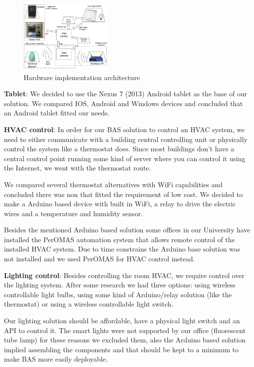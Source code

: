 \documentclass[conference]{IEEEtran}
\begin{document}
\begin{figure}[h]
\centering
\includegraphics[width=0.4\textwidth]{Figures/harware_arch_imp}
\caption{Hardware implementation architecture}
\label{imp:architecture_system}
\end{figure}

\textbf{Tablet}: We decided to use the Nexus 7 (2013) Android tablet as the base of our solution. We compared IOS, Android and Windows devices and concluded that an Android tablet fitted our needs.

\textbf{HVAC control}: In order for our \ac{BAS} solution to control an \ac{HVAC} system, we need to either communicate with a building central controlling unit or physically control the system like a thermostat does. Since most buildings don't have a central control point running some kind of server where you can control it using the Internet, we went with the thermostat route.

We compared several thermostat alternatives with WiFi capabilities and concluded there was non that fitted the requirement of low cost. We decided to make a Arduino based device with built in \ac{WiFi}, a relay to drive the electric wires and a temperature and humidity sensor. 

Besides the mentioned Arduino based solution some offices in our University have installed the PerOMAS automation system that allows remote control of the installed HVAC system. Due to time constrains the Arduino base solution was not installed and we used PerOMAS for HVAC control instead.





\textbf{Lighting control}:
Besides controlling the room \ac{HVAC}, we require control over the lighting system. After some research we had three options: using wireless controllable light bulbs, using some kind of Arduino/relay solution (like the thermostat) or using a wireless controllable light switch.

Our lighting solution should be affordable, have a physical light switch and an API to control it. The smart lights were not supported by our office (fluorescent tube lamp) for these reasons we excluded them, also the Arduino based solution implied assembling the components and that should be kept to a minimum to make BAS more easily deployable.
\end{document}
